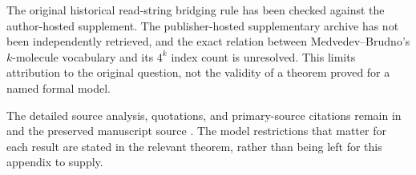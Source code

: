 The original historical read-string bridging rule has been checked against
the author-hosted supplement. The publisher-hosted supplementary archive
has not been independently retrieved, and the exact relation between
Medvedev--Brudno's $k$-molecule vocabulary and its $4^k$ index count
is unresolved. This limits attribution to the original question, not
the validity of a theorem proved for a named formal model.

The detailed source analysis, quotations, and primary-source citations
remain in  and the preserved manuscript source
. The model
restrictions that matter for each result are stated in the relevant
theorem, rather than being left for this appendix to supply.
